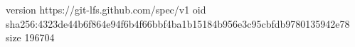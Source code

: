 version https://git-lfs.github.com/spec/v1
oid sha256:4323de44b6f864e94f6b4f66bbf4ba1b15184b956e3c95cbfdb9780135942e78
size 196704
